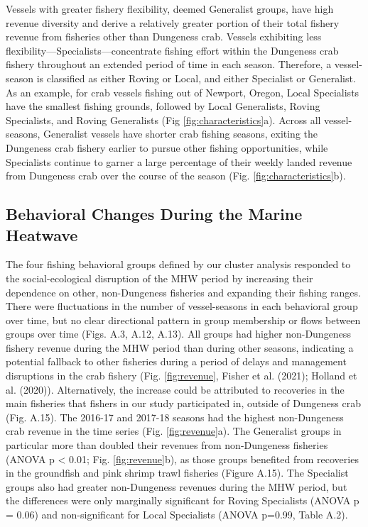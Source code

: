 \documentclass[]{elsarticle} %
\begin{document}
Vessels with greater fishery flexibility, deemed Generalist groups, have
high revenue diversity and derive a relatively greater portion of their
total fishery revenue from fisheries other than Dungeness crab. Vessels
exhibiting less flexibility---Specialists---concentrate fishing effort
within the Dungeness crab fishery throughout an extended period of time
in each season. Therefore, a vessel-season is classified as either
Roving or Local, and either Specialist or Generalist. As an example, for
crab vessels fishing out of Newport, Oregon, Local Specialists have the
smallest fishing grounds, followed by Local Generalists, Roving
Specialists, and Roving Generalists (Fig \ref{fig:characteristics}a).
Across all vessel-seasons, Generalist vessels have shorter crab fishing
seasons, exiting the Dungeness crab fishery earlier to pursue other
fishing opportunities, while Specialists continue to garner a large
percentage of their weekly landed revenue from Dungeness crab over the
course of the season (Fig. \ref{fig:characteristics}b).

\hypertarget{behavioral-changes-during-the-marine-heatwave}{%
\subsection{Behavioral Changes During the Marine
Heatwave}\label{behavioral-changes-during-the-marine-heatwave}}

The four fishing behavioral groups defined by our cluster analysis
responded to the social-ecological disruption of the MHW period by
increasing their dependence on other, non-Dungeness fisheries and
expanding their fishing ranges. There were fluctuations in the number of
vessel-seasons in each behavioral group over time, but no clear
directional pattern in group membership or flows between groups over
time (Figs. A.3, A.12, A.13). All groups had higher non-Dungeness
fishery revenue during the MHW period than during other seasons,
indicating a potential fallback to other fisheries during a period of
delays and management disruptions in the crab fishery (Fig.
\ref{fig:revenue}, Fisher et al. (2021); Holland et al. (2020)).
Alternatively, the increase could be attributed to recoveries in the
main fisheries that fishers in our study participated in, outside of
Dungeness crab (Fig. A.15). The 2016-17 and 2017-18 seasons had the
highest non-Dungeness crab revenue in the time series (Fig.
\ref{fig:revenue}a). The Generalist groups in particular more than
doubled their revenues from non-Dungeness fisheries (ANOVA p \textless{}
0.01; Fig. \ref{fig:revenue}b), as those groups benefited from
recoveries in the groundfish and pink shrimp trawl fisheries (Figure
A.15). The Specialist groups also had greater non-Dungeness revenues
during the MHW period, but the differences were only marginally
significant for Roving Specialists (ANOVA p = 0.06) and non-significant
for Local Specialists (ANOVA p=0.99, Table A.2).
\end{document}
